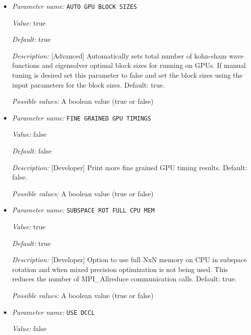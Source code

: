 \begin{itemize}
\item {\it Parameter name:} {\tt AUTO GPU BLOCK SIZES}
\label{parameters:GPU/AUTO GPU BLOCK SIZES}
\label{parameters:GPU/AUTO_20GPU_20BLOCK_20SIZES}


{\it Value:} true


{\it Default:} true


{\it Description:} [Advanced] Automatically sets total number of kohn-sham wave functions and eigensolver optimal block sizes for running on GPUs. If manual tuning is desired set this parameter to false and set the block sizes using the input parameters for the block sizes. Default: true.


{\it Possible values:} A boolean value (true or false)
\item {\it Parameter name:} {\tt FINE GRAINED GPU TIMINGS}
\label{parameters:GPU/FINE GRAINED GPU TIMINGS}
\label{parameters:GPU/FINE_20GRAINED_20GPU_20TIMINGS}


{\it Value:} false


{\it Default:} false


{\it Description:} [Developer] Print more fine grained GPU timing results. Default: false.


{\it Possible values:} A boolean value (true or false)
\item {\it Parameter name:} {\tt SUBSPACE ROT FULL CPU MEM}
\label{parameters:GPU/SUBSPACE ROT FULL CPU MEM}
\label{parameters:GPU/SUBSPACE_20ROT_20FULL_20CPU_20MEM}


{\it Value:} true


{\it Default:} true


{\it Description:} [Developer] Option to use full NxN memory on CPU in subspace rotation and when mixed precision optimization is not being used. This reduces the number of MPI\_Allreduce communication calls. Default: true.


{\it Possible values:} A boolean value (true or false)
\item {\it Parameter name:} {\tt USE DCCL}
\label{parameters:GPU/USE DCCL}
\label{parameters:GPU/USE_20DCCL}


{\it Value:} false



\end{itemize}
